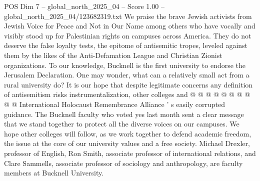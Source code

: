 \begin{textsample}{POS Dim 7 – global\_north\_2025\_04 – Score 1.00 – global\_north\_2025\_04/123682319.txt}
We praise the brave Jewish activists from Jewish Voice for Peace and Not in Our Name among others who have vocally and visibly stood up for Palestinian rights on campuses across America.
They do not deserve the false loyalty tests, the epitome of antisemitic tropes, leveled against them by the likes of the Anti-Defamation League and Christian Zionist organizations.
To our knowledge, Bucknell is the first university to endorse the Jerusalem Declaration.
One may wonder, what can a relatively small act from a rural university do?
It is our hope that despite legitimate concerns any definition of antisemitism risks instrumentalization, other colleges and @ @ @ @ @ @ @ @ @ @ International Holocaust Remembrance Alliance ' s easily corrupted guidance.
The Bucknell faculty who voted yes last month sent a clear message that we stand together to protect all the diverse voices on our campuses.
We hope other colleges will follow, as we work together to defend academic freedom, the issue at the core of our university values and a free society.
Michael Drexler, professor of English, Ron Smith, associate professor of international relations, and Clare Sammells, associate professor of sociology and anthropology, are faculty members at Bucknell University.

\end{textsample}
